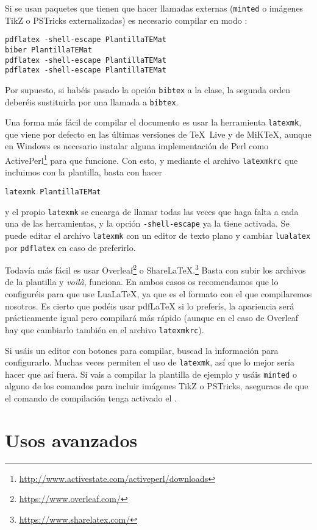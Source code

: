 \documentclass[bibtex]{TEMat-article}
\begin{document}
Si se usan paquetes que tienen que hacer llamadas externas (\verb+minted+ o imágenes TikZ o PSTricks externalizadas) es necesario compilar en modo :
\begin{verbatim}
pdflatex -shell-escape PlantillaTEMat
biber PlantillaTEMat
pdflatex -shell-escape PlantillaTEMat
pdflatex -shell-escape PlantillaTEMat
\end{verbatim}

Por supuesto, si habéis pasado la opción \verb+bibtex+ a la clase, la segunda orden deberéis sustituirla por una llamada a \verb+bibtex+.

Una forma más fácil de compilar el documento es usar la herramienta \verb+latexmk+, que viene por defecto en las últimas versiones de \TeX~Live y de MiK\TeX{}, aunque en Windows es necesario instalar alguna implementación de Perl como ActivePerl\footnote{\url{http://www.activestate.com/activeperl/downloads}} para que funcione.
Con esto, y mediante el archivo \verb+latexmkrc+ que incluimos con la plantilla, basta con hacer
\begin{verbatim}
latexmk PlantillaTEMat
\end{verbatim}
y el propio \verb+latexmk+ se encarga de llamar todas las veces que haga falta a cada una de las herramientas, y la opción \verb+-shell-escape+ ya la tiene activada.
Se puede editar el archivo \verb+latexmk+ con un editor de texto plano y cambiar \verb+lualatex+ por \verb+pdflatex+ en caso de preferirlo.

Todavía más fácil es usar Overleaf\footnote{\url{https://www.overleaf.com/}} o ShareLaTeX.\footnote{\url{https://www.sharelatex.com/}}
Basta con subir los archivos de la plantilla y \emph{voilà}, funciona.
En ambos casos os recomendamos que lo configuréis para que use LuaLaTeX, ya que es el formato con el que compilaremos nosotros.
Es cierto que podéis usar pdfLaTeX si lo preferís, la apariencia será prácticamente igual pero compilará más rápido (aunque en el caso de Overleaf hay que cambiarlo también en el archivo \verb+latexmkrc+).

Si usáis un editor con botones para compilar, buscad la información para configurarlo.
Muchas veces permiten el uso de \verb+latexmk+, así que lo mejor sería hacer que así fuera.
Si vais a compilar la plantilla de ejemplo y usáis \verb+minted+ o alguno de los comandos para incluir imágenes TikZ o PSTricks, aseguraos de que el comando de compilación tenga activado el .


\section{Usos avanzados}
\end{document}
